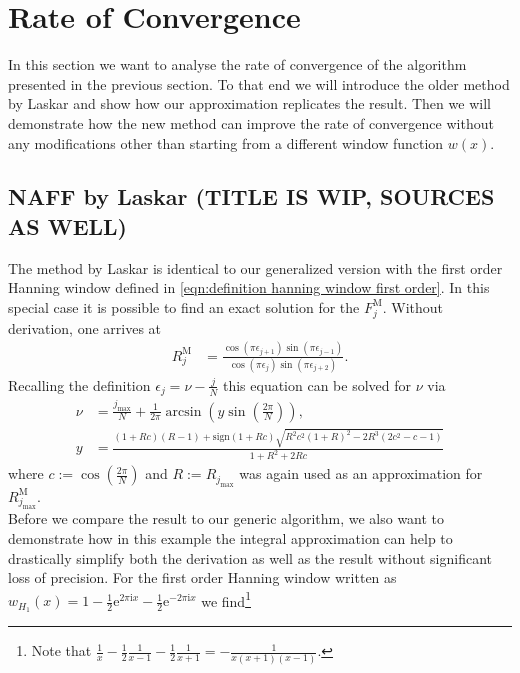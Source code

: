 \documentclass[english, parskip=full]{scrartcl}     %
\newcommand{\kla}{}
\newcommand{\tecxt}{}
\renewcommand{\i}{\text{i}}
\newcommand{\e}{\text{e}}
\begin{document}
\section{Rate of Convergence}
In this section we want to analyse the rate of convergence of the algorithm presented in the previous section.
To that end we will introduce the older method by Laskar and show how our approximation replicates the result.
Then we will demonstrate how the new method can improve the rate of convergence without any modifications other than starting from a different window function $w(x)$.
\subsection{NAFF by Laskar (TITLE IS WIP, SOURCES AS WELL)}
The method by Laskar is identical to our generalized version with the first order Hanning window defined in \autoref{eqn:definition hanning window first order}.
In this special case it is possible to find an exact solution for the $F_j^\tecxt\text{M}$.
Without derivation, one arrives at
\begin{align}
R_j^\tecxt\text{M} &= \frac{\cos (\pi\epsilon_{j+1}) \sin (\pi\epsilon_{j-1}) }{\cos (\pi\epsilon_j) \sin (\pi\epsilon_{j+2})}.
\end{align}
Recalling the definition $\epsilon_j = \nu - \frac{j}{N}$ this equation can be solved for $\nu$ via
\begin{align}
\nu &= \frac{j_\tecxt\text{max}}{N} + \frac{1}{2\pi} \arcsin\kla\left( y \sin \kla\left( \frac{2\pi}{N} \right) \right), \label{eqn:Laskar exact hanning naff nu} \\
y &= \frac{(1+Rc)(R-1) + \tecxt\text{sign}(1+Rc) \sqrt{R^2c^2(1+R)^2 - 2R^3(2c^2 - c - 1)}}{1 + R^2 + 2Rc} \label{eqn:Laskar exact hanning naff y param}
\end{align} %
where $c := \cos \kla\left( \frac{2\pi}{N} \right)$ and $R := R_{j_\tecxt\text{max}}$ was again used as an approximation for $R_{j_\tecxt\text{max}}^\tecxt\text{M}$.\\
Before we compare the result to our generic algorithm, we also want to demonstrate how in this example the integral approximation can help to drastically simplify both the derivation as well as the result without significant loss of precision.
For the first order Hanning window written as $w_{H_1}(x) = 1 - \frac{1}{2} \e^{2\pi\i x} - \frac{1}{2} \e^{-2\pi\i x} $ we find\footnote{Note that $\frac{1}{x} - \frac{1}{2} \frac{1}{x - 1} - \frac{1}{2} \frac{1}{x + 1} = -\frac{1}{x(x+1)(x-1)}$.}
\end{document}

